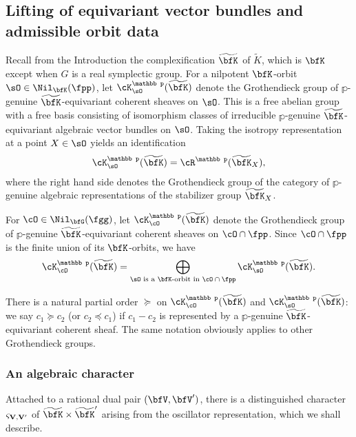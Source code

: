 \documentclass[12pt,a4paper]{amsart}
\newcommand{\wt}{\widetilde}
\numberwithin{equation}{section}
\theoremstyle{remark}
\def\wtbfK{\widetilde{\bfK}}
\def\mktvvp{\varsigma_{{\bf V},{\bf V}'}}
\begin{document}
\subsection{Lifting of equivariant vector bundles and admissible orbit
  data}\label{sec:LVB}
Recall from the Introduction the complexification $\wtbfK$ of $\widetilde K$, which is  $\bfK$ except when $G$ is a  real symplectic group.
For a nilpotent $\bfK$-orbit $\sO\in \Nil_{\bfK}(\fpp)$, %
let $\cK_{\sO}^{\mathbb p}(\wtbfK)$ denote the Grothendieck group of $\mathbb p$-genuine $\wtbfK$-equivariant coherent sheaves on
$\sO$. This is a free abelian group with a free basis consisting of isomorphism classes of  irreducible $\mathbb p$-genuine $\wtbfK$-equivariant algebraic vector
bundles on $\sO$.  Taking the isotropy representation at a point $X\in \sO$ yields an identification
\begin{equation}\label{idenkr}
  \cK_{\sO}^{\mathbb p}(\wtbfK)=\cR^{\mathbb p}(\wtbfK_{X}),
\end{equation}
where the right hand side denotes
  the Grothendieck group  of the category of $\mathbb p$-genuine
  algebraic representations of the stabilizer group $\wtbfK_X$.


  For $\cO\in \Nil_{\bfG}(\fgg)$, let $\cK^{\mathbb p}_{\cO}(\wt{\bfK})$ denote the
  Grothendieck group
  of $\mathbb p$-genuine $\wt{\bfK}$-equivariant coherent sheaves on $\cO\cap \fpp$. Since
  $\cO\cap \fpp$ is the finite union of its $\bfK$-orbits, we have
  \begin{equation}\label{eq:dec.KO}
    \cK_{\cO}^{\mathbb p}(\wt{\bfK})=\bigoplus_{\sO\textrm{ is a $\bfK$-orbit in $\cO\cap \fpp$}} \cK^{\mathbb p}_{\sO}(\wt{\bfK}).
  \end{equation}

  There is a natural partial order $\succeq$ on $\cK_{\cO}^{\mathbb p}(\wt{\bfK})$ and
  $\cK^{\mathbb p}_{\sO}(\wt{\bfK})$: we say $c_1\succeq c_2$ (or $c_2\preceq c_1$) if $c_1-c_2$ is represented by a
  $\mathbb p$-genuine $\wtbfK$-equivariant coherent sheaf. The same notation obviously applies  to other Grothendieck groups.



  \subsubsection{An algebraic character}%
  Attached to a rational dual pair $(\bfV,\bfV')$, there is a distinguished character
  $\mktvvp$ of
  $\wtbfK\times\wtbfK'$ arising from the oscillator
  representation, which we shall describe.
\end{document}
